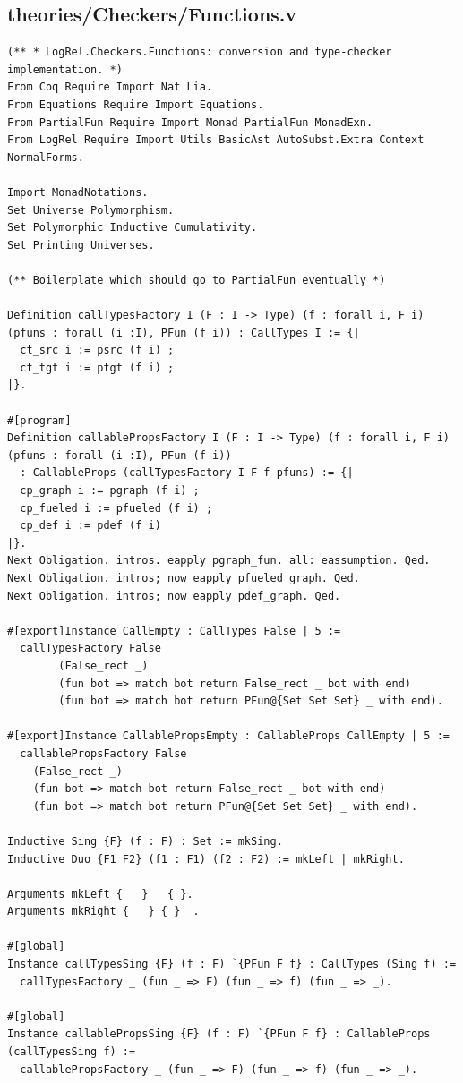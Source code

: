 \documentclass[10pt,a4paper]{amsart}
\begin{document}
\subsection*{theories/Checkers/Functions.v}
\begin{lstlisting}
(** * LogRel.Checkers.Functions: conversion and type-checker implementation. *)
From Coq Require Import Nat Lia.
From Equations Require Import Equations.
From PartialFun Require Import Monad PartialFun MonadExn.
From LogRel Require Import Utils BasicAst AutoSubst.Extra Context NormalForms.

Import MonadNotations.
Set Universe Polymorphism.
Set Polymorphic Inductive Cumulativity.
Set Printing Universes.

(** Boilerplate which should go to PartialFun eventually *)

Definition callTypesFactory I (F : I -> Type) (f : forall i, F i) (pfuns : forall (i :I), PFun (f i)) : CallTypes I := {|
  ct_src i := psrc (f i) ;
  ct_tgt i := ptgt (f i) ;
|}.

#[program]
Definition callablePropsFactory I (F : I -> Type) (f : forall i, F i) (pfuns : forall (i :I), PFun (f i))
  : CallableProps (callTypesFactory I F f pfuns) := {|
  cp_graph i := pgraph (f i) ;
  cp_fueled i := pfueled (f i) ;
  cp_def i := pdef (f i)
|}.
Next Obligation. intros. eapply pgraph_fun. all: eassumption. Qed.
Next Obligation. intros; now eapply pfueled_graph. Qed.
Next Obligation. intros; now eapply pdef_graph. Qed.

#[export]Instance CallEmpty : CallTypes False | 5 :=
  callTypesFactory False
        (False_rect _)
        (fun bot => match bot return False_rect _ bot with end)
        (fun bot => match bot return PFun@{Set Set Set} _ with end).

#[export]Instance CallablePropsEmpty : CallableProps CallEmpty | 5 :=
  callablePropsFactory False
    (False_rect _)
    (fun bot => match bot return False_rect _ bot with end)
    (fun bot => match bot return PFun@{Set Set Set} _ with end).

Inductive Sing {F} (f : F) : Set := mkSing.
Inductive Duo {F1 F2} (f1 : F1) (f2 : F2) := mkLeft | mkRight.

Arguments mkLeft {_ _} _ {_}.
Arguments mkRight {_ _} {_} _.

#[global]
Instance callTypesSing {F} (f : F) `{PFun F f} : CallTypes (Sing f) :=
  callTypesFactory _ (fun _ => F) (fun _ => f) (fun _ => _).

#[global]
Instance callablePropsSing {F} (f : F) `{PFun F f} : CallableProps (callTypesSing f) :=
  callablePropsFactory _ (fun _ => F) (fun _ => f) (fun _ => _).


\end{lstlisting}
\end{document}
